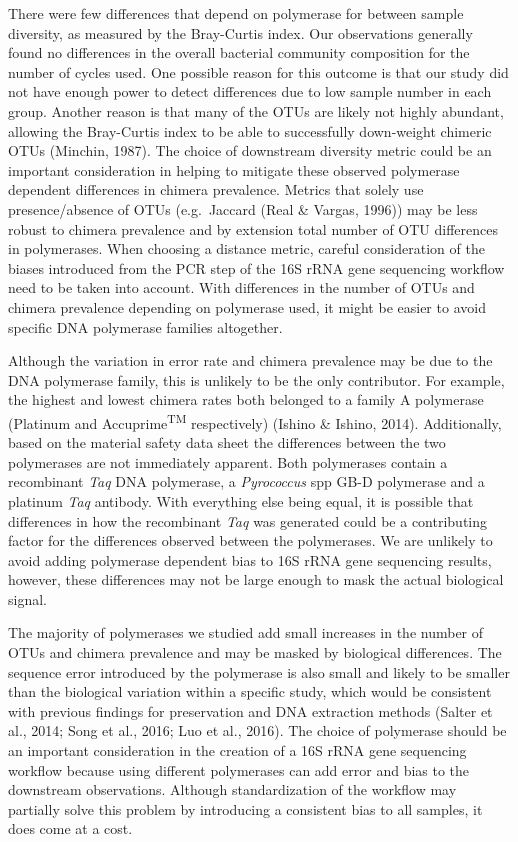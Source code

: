 \documentclass[12pt,]{article}
\begin{document}
There were few differences that depend on polymerase for between sample
diversity, as measured by the Bray-Curtis index. Our observations
generally found no differences in the overall bacterial community
composition for the number of cycles used. One possible reason for this
outcome is that our study did not have enough power to detect
differences due to low sample number in each group. Another reason is
that many of the OTUs are likely not highly abundant, allowing the
Bray-Curtis index to be able to successfully down-weight chimeric OTUs
(Minchin, 1987). The choice of downstream diversity metric could be an
important consideration in helping to mitigate these observed polymerase
dependent differences in chimera prevalence. Metrics that solely use
presence/absence of OTUs (e.g.~Jaccard (Real \& Vargas, 1996)) may be
less robust to chimera prevalence and by extension total number of OTU
differences in polymerases. When choosing a distance metric, careful
consideration of the biases introduced from the PCR step of the 16S rRNA
gene sequencing workflow need to be taken into account. With differences
in the number of OTUs and chimera prevalence depending on polymerase
used, it might be easier to avoid specific DNA polymerase families
altogether.

Although the variation in error rate and chimera prevalence may be due
to the DNA polymerase family, this is unlikely to be the only
contributor. For example, the highest and lowest chimera rates both
belonged to a family A polymerase (Platinum and
Accuprime\textsuperscript{TM} respectively) (Ishino \& Ishino, 2014).
Additionally, based on the material safety data sheet the differences
between the two polymerases are not immediately apparent. Both
polymerases contain a recombinant \emph{Taq} DNA polymerase, a
\emph{Pyrococcus} spp GB-D polymerase and a platinum \emph{Taq}
antibody. With everything else being equal, it is possible that
differences in how the recombinant \emph{Taq} was generated could be a
contributing factor for the differences observed between the
polymerases. We are unlikely to avoid adding polymerase dependent bias
to 16S rRNA gene sequencing results, however, these differences may not
be large enough to mask the actual biological signal.

The majority of polymerases we studied add small increases in the number
of OTUs and chimera prevalence and may be masked by biological
differences. The sequence error introduced by the polymerase is also
small and likely to be smaller than the biological variation within a
specific study, which would be consistent with previous findings for
preservation and DNA extraction methods (Salter et al., 2014; Song et
al., 2016; Luo et al., 2016). The choice of polymerase should be an
important consideration in the creation of a 16S rRNA gene sequencing
workflow because using different polymerases can add error and bias to
the downstream observations. Although standardization of the workflow
may partially solve this problem by introducing a consistent bias to all
samples, it does come at a cost.
\end{document}
